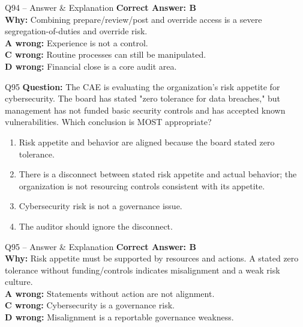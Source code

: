 \documentclass[aspectratio=169,10pt]{beamer}
\begin{document}
	\begin{frame}[t]{Q94 -- Answer \& Explanation}
		\small
		\textbf{Correct Answer: B} \\[4pt]
		\textbf{Why:} Combining prepare/review/post and override access is a severe segregation-of-duties and override risk. \\[4pt]
		\textbf{A wrong:} Experience is not a control. \\[2pt]
		\textbf{C wrong:} Routine processes can still be manipulated. \\[2pt]
		\textbf{D wrong:} Financial close is a core audit area.
	\end{frame}
	
	\begin{frame}[t]{Q95}
		\small
		\textbf{Question:} The CAE is evaluating the organization's risk appetite for cybersecurity. The board has stated "zero tolerance for data breaches," but management has not funded basic security controls and has accepted known vulnerabilities. Which conclusion is MOST appropriate?
		\begin{enumerate}[label=\Alph*.,itemsep=1pt,topsep=2pt]
			\item Risk appetite and behavior are aligned because the board stated zero tolerance.
			\item There is a disconnect between stated risk appetite and actual behavior; the organization is not resourcing controls consistent with its appetite.
			\item Cybersecurity risk is not a governance issue.
			\item The auditor should ignore the disconnect.
		\end{enumerate}
	\end{frame}
	
	\begin{frame}[t]{Q95 -- Answer \& Explanation}
		\small
		\textbf{Correct Answer: B} \\[4pt]
		\textbf{Why:} Risk appetite must be supported by resources and actions. A stated zero tolerance without funding/controls indicates misalignment and a weak risk culture. \\[4pt]
		\textbf{A wrong:} Statements without action are not alignment. \\[2pt]
		\textbf{C wrong:} Cybersecurity is a governance risk. \\[2pt]
		\textbf{D wrong:} Misalignment is a reportable governance weakness.
	\end{frame}
	
\end{document}
